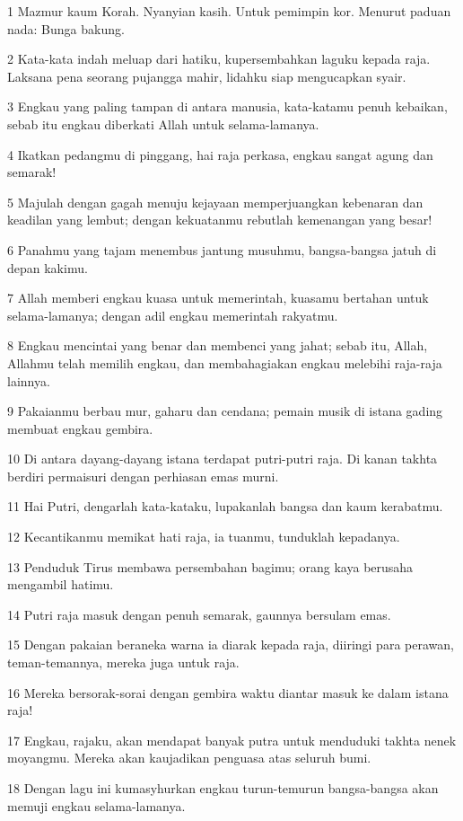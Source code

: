 \par 1 Mazmur kaum Korah. Nyanyian kasih. Untuk pemimpin kor. Menurut paduan nada: Bunga bakung.
\par 2 Kata-kata indah meluap dari hatiku, kupersembahkan laguku kepada raja. Laksana pena seorang pujangga mahir, lidahku siap mengucapkan syair.
\par 3 Engkau yang paling tampan di antara manusia, kata-katamu penuh kebaikan, sebab itu engkau diberkati Allah untuk selama-lamanya.
\par 4 Ikatkan pedangmu di pinggang, hai raja perkasa, engkau sangat agung dan semarak!
\par 5 Majulah dengan gagah menuju kejayaan memperjuangkan kebenaran dan keadilan yang lembut; dengan kekuatanmu rebutlah kemenangan yang besar!
\par 6 Panahmu yang tajam menembus jantung musuhmu, bangsa-bangsa jatuh di depan kakimu.
\par 7 Allah memberi engkau kuasa untuk memerintah, kuasamu bertahan untuk selama-lamanya; dengan adil engkau memerintah rakyatmu.
\par 8 Engkau mencintai yang benar dan membenci yang jahat; sebab itu, Allah, Allahmu telah memilih engkau, dan membahagiakan engkau melebihi raja-raja lainnya.
\par 9 Pakaianmu berbau mur, gaharu dan cendana; pemain musik di istana gading membuat engkau gembira.
\par 10 Di antara dayang-dayang istana terdapat putri-putri raja. Di kanan takhta berdiri permaisuri dengan perhiasan emas murni.
\par 11 Hai Putri, dengarlah kata-kataku, lupakanlah bangsa dan kaum kerabatmu.
\par 12 Kecantikanmu memikat hati raja, ia tuanmu, tunduklah kepadanya.
\par 13 Penduduk Tirus membawa persembahan bagimu; orang kaya berusaha mengambil hatimu.
\par 14 Putri raja masuk dengan penuh semarak, gaunnya bersulam emas.
\par 15 Dengan pakaian beraneka warna ia diarak kepada raja, diiringi para perawan, teman-temannya, mereka juga untuk raja.
\par 16 Mereka bersorak-sorai dengan gembira waktu diantar masuk ke dalam istana raja!
\par 17 Engkau, rajaku, akan mendapat banyak putra untuk menduduki takhta nenek moyangmu. Mereka akan kaujadikan penguasa atas seluruh bumi.
\par 18 Dengan lagu ini kumasyhurkan engkau turun-temurun bangsa-bangsa akan memuji engkau selama-lamanya.

